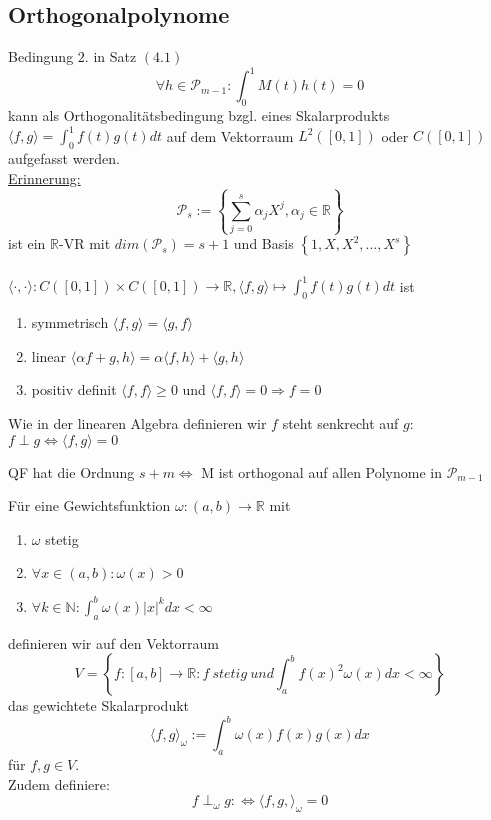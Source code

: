 \subsection{Orthogonalpolynome}
Bedingung $2.$ in Satz $(4.1)$ 
$$ \forall h \in \mathcal{P}_{m-1}: \int_0^1 M(t)h(t) = 0$$
kann als Orthogonalitätsbedingung bzgl. eines Skalarprodukts $\langle f, g\rangle = \int_0^1 f(t)g(t)dt$ auf dem Vektorraum $L^2([0,1])$ oder $C([0,1])$ aufgefasst werden. \\
\underline{Erinnerung:}
$$\mathcal{P}_s := \left\{ \sum_{j=0}^s \alpha_j X^j, \alpha_j \in \mathbb{R} \right\}$$ 
ist ein $\mathbb{R}$-VR mit $dim(\mathcal{P}_s) = s+1$ und Basis $\left\{ 1, X, X^2, ..., X^s \right\}$\\ \\
$\langle\cdot,\cdot\rangle : C([0,1]) \times C([0,1]) \rightarrow \mathbb{R}, \langle f, g\rangle \mapsto \int_0^1 f(t)g(t)dt$ ist 
\begin{enumerate}
  \item symmetrisch $ \langle f, g\rangle = \langle g, f\rangle$
  \item linear $\langle \alpha f + g, h\rangle = \alpha \langle f, h\rangle + \langle g, h\rangle$
  \item positiv definit $\langle f, f\rangle \geq 0 $ und $ \langle f, f\rangle = 0 \Rightarrow f = 0$
\end{enumerate}
Wie in der linearen Algebra definieren wir $f$ steht senkrecht auf $g$: $f \perp g \Leftrightarrow \langle f, g\rangle = 0$

\begin{theorem}
QF hat die Ordnung $s+m \Leftrightarrow $ M ist orthogonal auf allen Polynome in $\mathcal{P}_{m-1}$
\end{theorem}

\begin{definition}
Für eine Gewichtsfunktion $\omega : (a, b) \rightarrow \mathbb{R}$ mit 
\begin{enumerate}
  \item $\omega$ stetig
  \item $\forall x\in(a,b): \omega(x) > 0 $
  \item $\forall k \in \mathbb{N}: \int_a^b \omega(x) \vert x \vert^k dx < \infty$
\end{enumerate}
definieren wir auf den Vektorraum 
$$ V = \left\{ f: [a,b] \rightarrow \mathbb{R}: f \medspace stetig \medspace und \int_a^b f(x)^2 \omega(x) dx < \infty \right\} $$
das gewichtete Skalarprodukt
$$ \langle f, g \rangle_\omega := \int_a^b \omega(x)f(x)g(x)dx$$
für $f, g \in V$. \\
Zudem definiere:
$$f \perp_\omega g :\Leftrightarrow \langle f, g, \rangle_\omega = 0$$
\end{definition}

